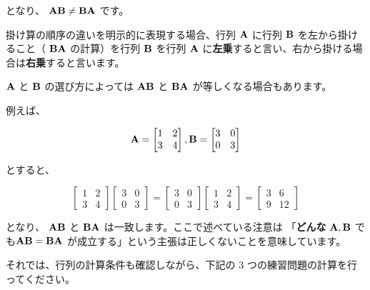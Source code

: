 となり、 ${\bf AB} \not = {\bf BA}$ です。

掛け算の順序の違いを明示的に表現する場合、行列 ${\bf A}$ に行列 ${\bf B}$ を左から掛けること（ ${\bf BA}$ の計算）を行列 ${\bf B}$ を行列 ${\bf A}$ に\textbf{左乗}すると言い、右から掛ける場合は\textbf{右乗}すると言います。


${\bf A}$ と ${\bf B}$ の選び方によっては ${\bf AB}$ と ${\bf BA}$ が等しくなる場合もあります。

例えば、


\[
{\bf A} = \begin{bmatrix}
1 & 2 \\
3 & 4
\end{bmatrix},
{\bf B} = \begin{bmatrix}
3 & 0 \\
0 & 3
\end{bmatrix}
\]


とすると、


\[
\begin{bmatrix}
1 & 2 \\
3 & 4
\end{bmatrix}
\begin{bmatrix}
3 & 0 \\
0 & 3
\end{bmatrix} =
\begin{bmatrix}
3 & 0 \\
0 & 3
\end{bmatrix}
\begin{bmatrix}
1 & 2 \\
3 & 4
\end{bmatrix} =
\begin{bmatrix}
3 & 6 \\
9 & 12
\end{bmatrix}
\]


となり、 ${\bf AB}$ と ${\bf BA}$ は一致します。ここで述べている注意は 「\textbf{どんな} ${\bf A}, {\bf B}$ でも${\bf AB} = {\bf BA}$ が成立する」という主張は正しくないことを意味しています。


それでは、行列の計算条件も確認しながら、下記の 3 つの練習問題の計算を行ってください。



